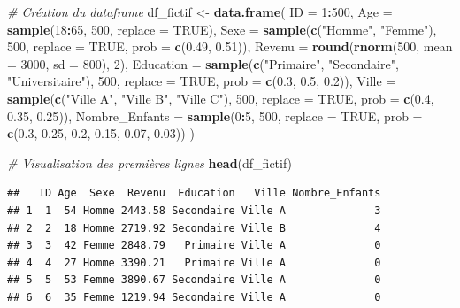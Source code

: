 \documentclass[
]{article}
\newenvironment{Shaded}{\begin{snugshade}}{\end{snugshade}}
\newcommand{\AttributeTok}[1]{\textcolor[rgb]{0.13,0.29,0.53}{#1}}
\newcommand{\CommentTok}[1]{\textcolor[rgb]{0.56,0.35,0.01}{\textit{#1}}}
\newcommand{\ConstantTok}[1]{\textcolor[rgb]{0.56,0.35,0.01}{#1}}
\newcommand{\DecValTok}[1]{\textcolor[rgb]{0.00,0.00,0.81}{#1}}
\newcommand{\FloatTok}[1]{\textcolor[rgb]{0.00,0.00,0.81}{#1}}
\newcommand{\FunctionTok}[1]{\textcolor[rgb]{0.13,0.29,0.53}{\textbf{#1}}}
\newcommand{\NormalTok}[1]{#1}
\newcommand{\OtherTok}[1]{\textcolor[rgb]{0.56,0.35,0.01}{#1}}
\newcommand{\SpecialCharTok}[1]{\textcolor[rgb]{0.81,0.36,0.00}{\textbf{#1}}}
\newcommand{\StringTok}[1]{\textcolor[rgb]{0.31,0.60,0.02}{#1}}
\begin{document}
\begin{Shaded}
\begin{Highlighting}[]
\CommentTok{\# Création du dataframe}
\NormalTok{df\_fictif }\OtherTok{\textless{}{-}} \FunctionTok{data.frame}\NormalTok{(}
  \AttributeTok{ID =} \DecValTok{1}\SpecialCharTok{:}\DecValTok{500}\NormalTok{,}
  \AttributeTok{Age =} \FunctionTok{sample}\NormalTok{(}\DecValTok{18}\SpecialCharTok{:}\DecValTok{65}\NormalTok{, }\DecValTok{500}\NormalTok{, }\AttributeTok{replace =} \ConstantTok{TRUE}\NormalTok{),}
  \AttributeTok{Sexe =} \FunctionTok{sample}\NormalTok{(}\FunctionTok{c}\NormalTok{(}\StringTok{"Homme"}\NormalTok{, }\StringTok{"Femme"}\NormalTok{), }\DecValTok{500}\NormalTok{, }\AttributeTok{replace =} \ConstantTok{TRUE}\NormalTok{, }\AttributeTok{prob =} \FunctionTok{c}\NormalTok{(}\FloatTok{0.49}\NormalTok{, }\FloatTok{0.51}\NormalTok{)),}
  \AttributeTok{Revenu =} \FunctionTok{round}\NormalTok{(}\FunctionTok{rnorm}\NormalTok{(}\DecValTok{500}\NormalTok{, }\AttributeTok{mean =} \DecValTok{3000}\NormalTok{, }\AttributeTok{sd =} \DecValTok{800}\NormalTok{), }\DecValTok{2}\NormalTok{),}
  \AttributeTok{Education =} \FunctionTok{sample}\NormalTok{(}\FunctionTok{c}\NormalTok{(}\StringTok{"Primaire"}\NormalTok{, }\StringTok{"Secondaire"}\NormalTok{, }\StringTok{"Universitaire"}\NormalTok{), }\DecValTok{500}\NormalTok{, }\AttributeTok{replace =} \ConstantTok{TRUE}\NormalTok{, }\AttributeTok{prob =} \FunctionTok{c}\NormalTok{(}\FloatTok{0.3}\NormalTok{, }\FloatTok{0.5}\NormalTok{, }\FloatTok{0.2}\NormalTok{)),}
  \AttributeTok{Ville =} \FunctionTok{sample}\NormalTok{(}\FunctionTok{c}\NormalTok{(}\StringTok{"Ville A"}\NormalTok{, }\StringTok{"Ville B"}\NormalTok{, }\StringTok{"Ville C"}\NormalTok{), }\DecValTok{500}\NormalTok{, }\AttributeTok{replace =} \ConstantTok{TRUE}\NormalTok{, }\AttributeTok{prob =} \FunctionTok{c}\NormalTok{(}\FloatTok{0.4}\NormalTok{, }\FloatTok{0.35}\NormalTok{, }\FloatTok{0.25}\NormalTok{)),}
  \AttributeTok{Nombre\_Enfants =} \FunctionTok{sample}\NormalTok{(}\DecValTok{0}\SpecialCharTok{:}\DecValTok{5}\NormalTok{, }\DecValTok{500}\NormalTok{, }\AttributeTok{replace =} \ConstantTok{TRUE}\NormalTok{, }\AttributeTok{prob =} \FunctionTok{c}\NormalTok{(}\FloatTok{0.3}\NormalTok{, }\FloatTok{0.25}\NormalTok{, }\FloatTok{0.2}\NormalTok{, }\FloatTok{0.15}\NormalTok{, }\FloatTok{0.07}\NormalTok{, }\FloatTok{0.03}\NormalTok{))}
\NormalTok{)}

\CommentTok{\# Visualisation des premières lignes}
\FunctionTok{head}\NormalTok{(df\_fictif)}
\end{Highlighting}
\end{Shaded}

\begin{verbatim}
##   ID Age  Sexe  Revenu  Education   Ville Nombre_Enfants
## 1  1  54 Homme 2443.58 Secondaire Ville A              3
## 2  2  18 Homme 2719.92 Secondaire Ville B              4
## 3  3  42 Femme 2848.79   Primaire Ville A              0
## 4  4  27 Homme 3390.21   Primaire Ville A              0
## 5  5  53 Femme 3890.67 Secondaire Ville A              0
## 6  6  35 Femme 1219.94 Secondaire Ville A              0
\end{verbatim}
\end{document}
